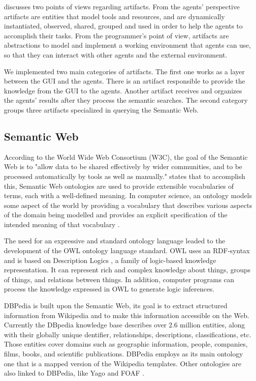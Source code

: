 \documentclass[a4paper,twoside]{article}
\begin{document}
\cite{ref5} discusses two points of views regarding artifacts. From the agents' perspective artifacts are entities that model tools and resources, and are dynamically instantiated, observed, shared, grouped and used in order to help the agents to accomplish their tasks. From the programmer's point of view, artifacts are abstractions to model and implement a working environment that agents can use, so that they can interact with other agents and the external environment.

We implemented two main categories of artifacts. The first one works as a layer between the GUI and the agents. There is an artifact responsible to provide the knowledge from the GUI to the agents. Another artifact receives and organizes the agents' results after they process the semantic searches. The second category groups three artifacts specialized in querying the Semantic Web.

\subsection{Semantic Web}

\noindent According to the World Wide Web Consortium (W3C), the goal of the Semantic Web is to "allow data to be shared effectively by wider communities, and to be processed automatically by tools as well as manually." \cite{ref53} states that to accomplish this, Semantic Web ontologies are used to provide extensible vocabularies of terms, each with a well-defined meaning. In computer science, an ontology models some aspect of the world by providing a vocabulary that describes various aspects of the domain being modelled and provides an explicit specification of the intended meaning of that vocabulary \cite{ref53}.

The need for an expressive and standard ontology language leaded to the development of the OWL ontology language standard. OWL uses an RDF-syntax and is based on Description Logics \cite{refDL}, a family of logic-based knowledge representation. It can represent rich and complex knowledge about things, groups of things, and relations between things. In addition, computer programs can process the knowledge expressed in OWL to generate logic inferences.

DBPedia \cite{refXYZ} is built upon the Semantic Web, its goal is to extract structured information from Wikipedia and to make this information accessible on the Web. Currently the DBpedia knowledge base describes over 2.6 million entities, along with their globally unique dentifier, relationships, descriptions, classifications, etc. Those entities cover domains such as geographic information, people, companies, films, books, and scientific publications. DBPedia employs as its main ontology one that is a mapped version of the Wikipedia templates. Other ontologies are also linked to DBPedia, like Yago \cite{refYAGO} and FOAF \cite{refFOAF}.
\end{document}
